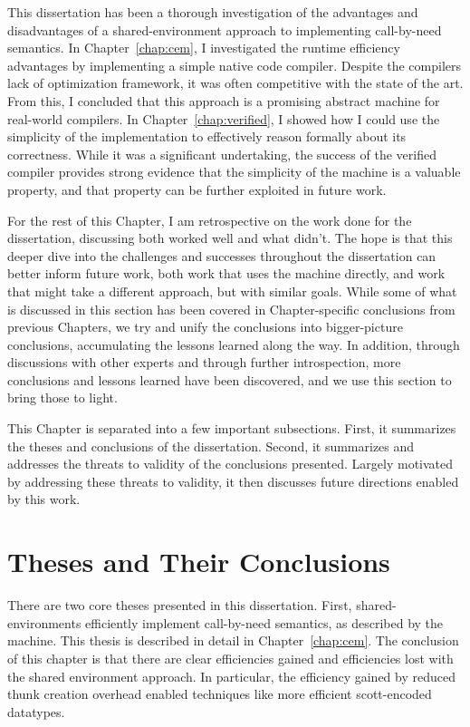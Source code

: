 This dissertation has been a thorough investigation of the advantages and
disadvantages of a shared-environment approach to implementing call-by-need
semantics. In Chapter~\ref{chap:cem}, I investigated the runtime efficiency
advantages by implementing a simple native code compiler. Despite the compilers
lack of optimization framework, it was often competitive with the state of the
art. From this, I concluded that this approach is a promising abstract machine 
for real-world compilers. In Chapter~\ref{chap:verified}, I showed how I could
use the simplicity of the implementation to effectively reason formally about
its correctness. While it was a significant undertaking, the success of the
verified compiler provides strong evidence that the simplicity of the machine is
a valuable property, and that property can be further exploited in future work.

For the rest of this Chapter, I am retrospective on the work done for the
dissertation, discussing both worked well and what didn't. The hope is that this
deeper dive into the challenges and successes throughout the dissertation can
better inform future work, both work that uses the \ce machine directly, and
work that might take a different approach, but with similar goals. While some of
what is discussed in this section has been covered in Chapter-specific
conclusions from previous Chapters, we try and unify the conclusions into
bigger-picture conclusions, accumulating the lessons learned along the way. In
addition, through discussions with other experts and through further
introspection, more conclusions and lessons learned have been discovered, and we
use this section to bring those to light. 

This Chapter is separated into a few important subsections. First, it summarizes
the theses and conclusions of the dissertation. Second, it summarizes and
addresses the threats to validity of the conclusions presented. Largely
motivated by addressing these threats to validity, it then discusses future
directions enabled by this work. 

\section{Theses and Their Conclusions}

There are two core theses presented in this dissertation. First,
shared-environments efficiently implement call-by-need semantics, as described
by the \ce machine. This thesis is described in detail in
Chapter~\ref{chap:cem}. The conclusion of this chapter is that there are clear
efficiencies gained and efficiencies lost with the shared environment approach.
In particular, the efficiency gained by reduced thunk creation overhead enabled
techniques like more efficient scott-encoded datatypes. 

